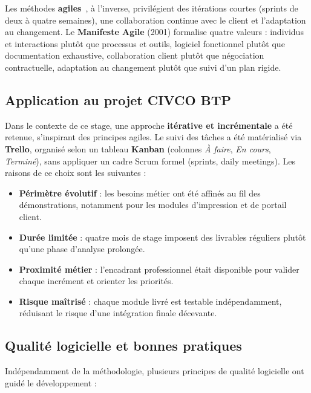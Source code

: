 \medskip

Les méthodes \textbf{agiles}~\cite{agilemanifesto}, à l'inverse, privilégient des
itérations courtes (sprints de deux à quatre semaines), une collaboration continue
avec le client et l'adaptation au changement. Le \textbf{Manifeste Agile} (2001)
formalise quatre valeurs : individus et interactions plutôt que processus et outils,
logiciel fonctionnel plutôt que documentation exhaustive, collaboration client plutôt
que négociation contractuelle, adaptation au changement plutôt que suivi d'un plan
rigide.

\subsection{Application au projet CIVCO BTP}

Dans le contexte de ce stage, une approche \textbf{itérative et incrémentale} a été
retenue, s'inspirant des principes agiles. Le suivi des tâches a été matérialisé via
\textbf{Trello}, organisé selon un tableau \textbf{Kanban} (colonnes \textit{À faire},
\textit{En cours}, \textit{Terminé}), sans appliquer un cadre Scrum formel (sprints,
daily meetings). Les raisons de ce choix sont les suivantes :

\begin{itemize}
  \item \textbf{Périmètre évolutif} : les besoins métier ont été affinés au fil des
  démonstrations, notamment pour les modules d'impression et de portail client.
  \item \textbf{Durée limitée} : quatre mois de stage imposent des livrables réguliers
  plutôt qu'une phase d'analyse prolongée.
  \item \textbf{Proximité métier} : l'encadrant professionnel était disponible pour
  valider chaque incrément et orienter les priorités.
  \item \textbf{Risque maîtrisé} : chaque module livré est testable indépendamment,
  réduisant le risque d'une intégration finale décevante.
\end{itemize}

\subsection{Qualité logicielle et bonnes pratiques}

Indépendamment de la méthodologie, plusieurs principes de qualité logicielle ont
guidé le développement :

